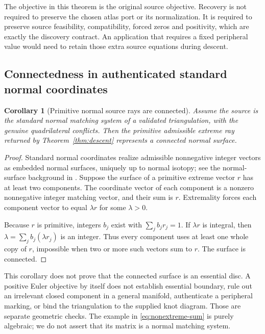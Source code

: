 \documentclass[11pt,a4paper]{article}
\newtheorem{corollary}[theorem]{Corollary}
\theoremstyle{definition}
\theoremstyle{remark}
\begin{document}
The objective in this theorem is the original source objective. Recovery is not required to preserve the chosen atlas port or its normalization. It is required to preserve source feasibility, compatibility, forced zeros and positivity, which are exactly the discovery contract. An application that requires a fixed peripheral value would need to retain those extra source equations during descent.

\subsection{Connectedness in authenticated standard normal coordinates}
\begin{corollary}[Primitive normal source rays are connected]
\label{cor:connected}
Assume the source is the standard normal matching system of a validated triangulation, with the genuine quadrilateral conflicts. Then the primitive admissible extreme ray returned by Theorem~\ref{thm:descent} represents a connected normal surface.
\end{corollary}
\begin{proof}
Standard normal coordinates realize admissible nonnegative integer vectors as embedded normal surfaces, uniquely up to normal isotopy; see the normal-surface background in \cite{bo,bps}. Suppose the surface of a primitive extreme vector $r$ has at least two components. The coordinate vector of each component is a nonzero nonnegative integer matching vector, and their sum is $r$. Extremality forces each component vector to equal $\lambda r$ for some $\lambda>0$.

Because $r$ is primitive, integers $b_j$ exist with $\sum_jb_jr_j=1$. If $\lambda r$ is integral, then $\lambda=\sum_jb_j(\lambda r_j)$ is an integer. Thus every component uses at least one whole copy of $r$, impossible when two or more such vectors sum to $r$. The surface is connected.
\end{proof}

This corollary does not prove that the connected surface is an essential disc. A positive Euler objective by itself does not establish essential boundary, rule out an irrelevant closed component in a general manifold, authenticate a peripheral marking, or bind the triangulation to the supplied knot diagram. Those are separate geometric checks. The example in \eqref{eq:nonextreme-sum} is purely algebraic; we do not assert that its matrix is a normal matching system.
\end{document}
